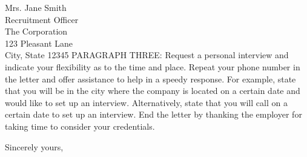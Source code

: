 \documentclass[11pt]{letter} %
\begin{document}
\begin{letter}{Mrs. Jane Smith \\
Recruitment Officer \\
The Corporation \\
123 Pleasant Lane \\
City, State 12345}
PARAGRAPH THREE: Request a personal interview and indicate your flexibility as to the time and place. Repeat your phone number in the letter and offer assistance to help in a speedy response. For example, state that you will be in the city where the company is located on a certain date and would like to set up an interview. Alternatively, state that you will call on a certain date to set up an interview. End the letter by thanking the employer for taking time to consider your credentials.

\closing{Sincerely yours,}




\end{letter}
\end{document}
